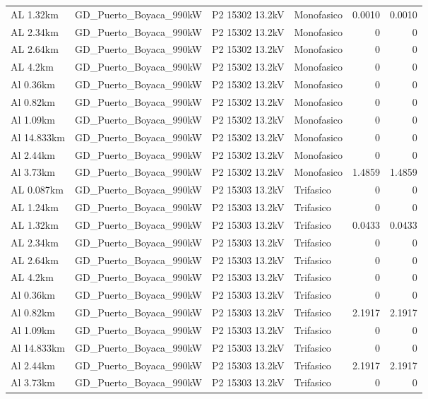 \documentclass[11pt,a4paper]{article}
\begin{document}
\begin{longtable}{llllrr}
AL 1.32km & GD\_Puerto\_Boyaca\_990kW & P2 15302 13.2kV & Monofasico & 0.0010 & 0.0010 \\
AL 2.34km & GD\_Puerto\_Boyaca\_990kW & P2 15302 13.2kV & Monofasico & 0 & 0 \\
AL 2.64km & GD\_Puerto\_Boyaca\_990kW & P2 15302 13.2kV & Monofasico & 0 & 0 \\
AL 4.2km & GD\_Puerto\_Boyaca\_990kW & P2 15302 13.2kV & Monofasico & 0 & 0 \\
Al 0.36km & GD\_Puerto\_Boyaca\_990kW & P2 15302 13.2kV & Monofasico & 0 & 0 \\
Al 0.82km & GD\_Puerto\_Boyaca\_990kW & P2 15302 13.2kV & Monofasico & 0 & 0 \\
Al 1.09km & GD\_Puerto\_Boyaca\_990kW & P2 15302 13.2kV & Monofasico & 0 & 0 \\
Al 14.833km & GD\_Puerto\_Boyaca\_990kW & P2 15302 13.2kV & Monofasico & 0 & 0 \\
Al 2.44km & GD\_Puerto\_Boyaca\_990kW & P2 15302 13.2kV & Monofasico & 0 & 0 \\
Al 3.73km & GD\_Puerto\_Boyaca\_990kW & P2 15302 13.2kV & Monofasico & 1.4859 & 1.4859 \\
AL 0.087km & GD\_Puerto\_Boyaca\_990kW & P2 15303 13.2kV & Trifasico & 0 & 0 \\
AL 1.24km & GD\_Puerto\_Boyaca\_990kW & P2 15303 13.2kV & Trifasico & 0 & 0 \\
AL 1.32km & GD\_Puerto\_Boyaca\_990kW & P2 15303 13.2kV & Trifasico & 0.0433 & 0.0433 \\
AL 2.34km & GD\_Puerto\_Boyaca\_990kW & P2 15303 13.2kV & Trifasico & 0 & 0 \\
AL 2.64km & GD\_Puerto\_Boyaca\_990kW & P2 15303 13.2kV & Trifasico & 0 & 0 \\
AL 4.2km & GD\_Puerto\_Boyaca\_990kW & P2 15303 13.2kV & Trifasico & 0 & 0 \\
Al 0.36km & GD\_Puerto\_Boyaca\_990kW & P2 15303 13.2kV & Trifasico & 0 & 0 \\
Al 0.82km & GD\_Puerto\_Boyaca\_990kW & P2 15303 13.2kV & Trifasico & 2.1917 & 2.1917 \\
Al 1.09km & GD\_Puerto\_Boyaca\_990kW & P2 15303 13.2kV & Trifasico & 0 & 0 \\
Al 14.833km & GD\_Puerto\_Boyaca\_990kW & P2 15303 13.2kV & Trifasico & 0 & 0 \\
Al 2.44km & GD\_Puerto\_Boyaca\_990kW & P2 15303 13.2kV & Trifasico & 2.1917 & 2.1917 \\
Al 3.73km & GD\_Puerto\_Boyaca\_990kW & P2 15303 13.2kV & Trifasico & 0 & 0 \\

\end{longtable}
\end{document}
